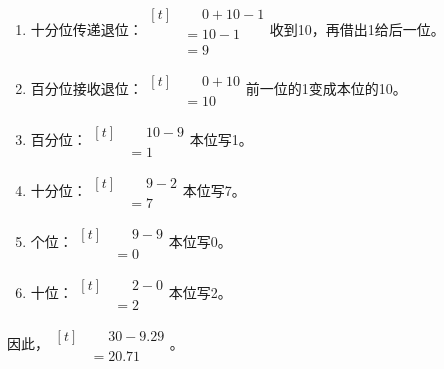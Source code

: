 {\begin{enumerate}[leftmargin=1.7em,itemsep=5pt,topsep=0pt]
\item 十分位传递退位：\(\begin{aligned}[t]&\phantom{={}}0+10-1\\&=10-1\\&=9\end{aligned}\)\quad 收到10，再借出1给后一位。
\item 百分位接收退位：\(\begin{aligned}[t]&\phantom{={}}0+10\\&=10\end{aligned}\)\quad 前一位的1变成本位的10。
\item 百分位：\(\begin{aligned}[t]&\phantom{={}}10-9\\&=1\end{aligned}\)\quad 本位写1。
\item 十分位：\(\begin{aligned}[t]&\phantom{={}}9-2\\&=7\end{aligned}\)\quad 本位写7。
\item 个位：\(\begin{aligned}[t]&\phantom{={}}9-9\\&=0\end{aligned}\)\quad 本位写0。
\item 十位：\(\begin{aligned}[t]&\phantom{={}}2-0\\&=2\end{aligned}\)\quad 本位写2。
\end{enumerate}
\par\smallskip
因此，\(\begin{aligned}[t]&\phantom{={}}30-9.29\\&=20.71\end{aligned}\)。
\par\medskip

}
